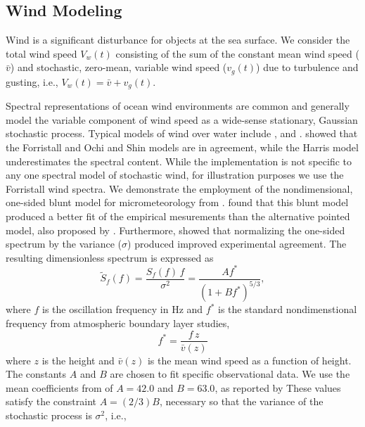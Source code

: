 \documentclass[utf8]{frontiersSCNS} %
\begin{document}
\subsection{Wind Modeling}\label{s:wind_model}
Wind is a significant disturbance for objects at the sea surface. We consider the total wind speed $V_w(t)$ consisting of the sum of the constant mean wind speed ($\bar{v}$) and stochastic, zero-mean, variable wind speed ($v_g(t)$) due to turbulence and gusting, i.e., $V_w(t)=\bar{v}+v_g(t)$.

Spectral representations of ocean wind environments are common and generally model the variable component of wind speed as a wide-sense stationary, Gaussian stochastic process.  Typical models of wind over water include \citet{harris71nature}, \citet{forristall88wind} and \citet{ochi13wind}. \citet{cole18reactive} showed that the Forristall and Ochi and Shin models are in agreement, while the Harris model underestimates the spectral content.  While the implementation is not specific to any one spectral model of stochastic wind, for illustration purposes we use the Forristall wind spectra.  \color{blue}We demonstrate the employment of the nondimensional, one-sided blunt model for micrometeorology from \citet{olesen84modelling}.  \citet{forristall88wind} found that this blunt model produced a better fit of the empirical mesurements than the alternative pointed model, also proposed by \citet{olesen84modelling}.  Furthermore, \citet{forristall88wind} showed that normalizing the one-sided spectrum by the variance ($\sigma$) produced improved experimental agreement.  The resulting dimensionless spectrum is expressed as 
\begin{equation}
  \widetilde{S}_f(f) = \frac{S_f(f)\,f}{\sigma^2}  = \frac{ A f^*}{( 1 + B f^*)^{5/3}},
    \label{e:forristall}
    \end{equation}
    \color{black}where $f$ is the oscillation frequency in \unit[]{Hz} and $f^*$ is the standard nondimenstional frequency from atmospheric boundary layer studies,
\begin{equation}
  f^* = \frac{f \, z}{\bar{v}(z)}
\end{equation}
where $z$ is the height and $\bar{v}(z)$ is the mean wind speed as a function of height. The constants $A$ and $B$ are chosen to fit specific observational data.  We use the mean coefficients from of $A=42.0$ and $B=63.0$, as reported by \citet{forristall88wind}  These values satisfy the constraint $A=(2/3)B$, necessary so that the variance of the stochastic process is $\sigma^2$, i.e.,
\end{document}
